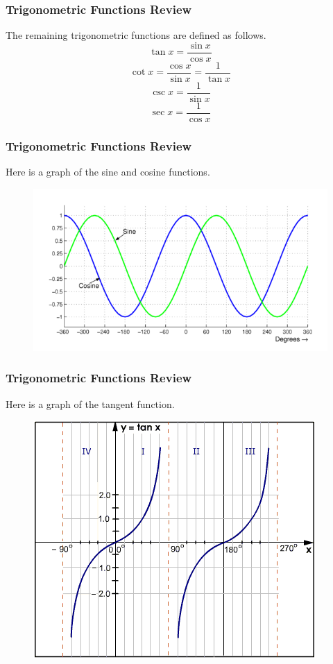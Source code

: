\documentclass[xcolor=dvipsnames]{beamer}
\begin{document}
\begin{frame}
  \frametitle{Trigonometric Functions Review}
  The remaining trigonometric functions are defined as follows.
  \begin{equation}
    \label{eq:eiyiexir}
    \tan{}x=\frac{\sin{}x}{\cos{}x}
  \end{equation}
  \begin{equation}
    \label{eq:dohquohb}
    \cot{}x=\frac{\cos{}x}{\sin{}x}=\frac{1}{\tan{}x}
  \end{equation}
  \begin{equation}
    \label{eq:eengohqu}
    \csc{}x=\frac{1}{\sin{}x}
  \end{equation}
  \begin{equation}
    \label{eq:eipuoxei}
    \sec{}x=\frac{1}{\cos{}x}
  \end{equation}
\end{frame}

\begin{frame}
  \frametitle{Trigonometric Functions Review}
  Here is a graph of the sine and cosine functions.
  \begin{figure}[h]
    \includegraphics[scale=2]{./diagrams/sinecosine.png}
  \end{figure}
\end{frame}

\begin{frame}
  \frametitle{Trigonometric Functions Review}
  Here is a graph of the tangent function.
  \begin{figure}[h]
    \includegraphics[scale=.5]{./diagrams/tangent.png}
  \end{figure}
\end{frame}
\end{document}
